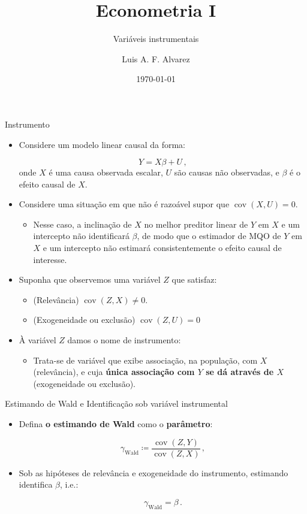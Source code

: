 \documentclass[11pt]{beamer}
\author{Luis A. F. Alvarez}
\title{Econometria I}
\subtitle{Variáveis instrumentais}
\date{\today}
\begin{document}
\begin{frame}[plain]
	\maketitle
\end{frame}
\begin{frame}{Instrumento}
	\begin{itemize}
		\item Considere um modelo linear {\color{blue}causal} da forma:
		
		$$Y = X\beta + U\, ,$$
		onde $X$ é uma causa observada escalar, $U$ são causas não observadas, e $\beta$ é o efeito causal de $X$.
		\item Considere uma situação em que não é razoável supor que $\operatorname{cov}(X,U) = 0$.
		\begin{itemize}
			\item Nesse caso, a inclinação de $X$ no melhor preditor linear de $Y$ em $X$ e um intercepto não identificará $\beta$, de modo que o estimador de MQO de $Y$ em $X$ e um intercepto não estimará consistentemente o efeito causal de interesse.  
		\end{itemize}
		\item Suponha que observemos uma variável $Z$ que satisfaz:
		\begin{itemize}
			\item (Relevância) $\operatorname{cov}(Z,X)\neq0$.
			\item (Exogeneidade ou exclusão)  $\operatorname{cov}(Z,U)=0$
		\end{itemize}
		\item À variável $Z$ damos o nome de {\color{green}instrumento}:
		\begin{itemize}
			\item Trata-se de variável que exibe associação, na população, com $X$ (relevância), e cuja \textbf{única associação com $Y$ se dá através de $X$} (exogeneidade ou exclusão).
		\end{itemize}
\end{itemize}
	\end{frame}
\begin{frame}{Estimando de Wald e Identificação sob variável instrumental}
\begin{itemize}
	\item Defina  \textbf{o estimando de Wald} como o \textbf{parâmetro}:
	
	$$\gamma_{\text{Wald}}  \coloneqq \frac{\operatorname{cov}(Z,Y)}{\operatorname{cov}(Z,X)}\,,$$
	\item Sob as hipóteses de relevância e exogeneidade do instrumento, estimando identifica $\beta$, i.e.:
	
	$$\gamma_{\text{Wald}} = \beta\, .$$
\end{itemize}
\end{frame}
\end{document}
